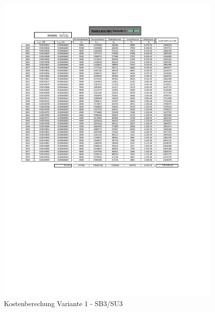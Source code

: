\begin{figure}[h!]
	\centering
	\includegraphics[width=\textwidth]{figures/Anhang/f-00-A-V1-B3-U3}
	\caption{Kostenberechung Variante 1 - SB3/SU3}
\end{figure}

